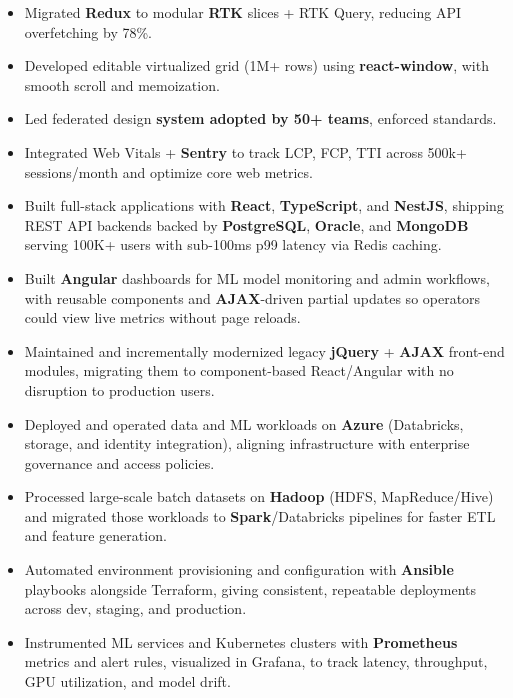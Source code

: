 \documentclass[a4paper]{article}
\begin{document}
\begin{itemize}
\item {Migrated \textbf{Redux} to modular \textbf{RTK} slices + RTK Query, reducing API overfetching by 78\%.}
\item {Developed editable virtualized grid (1M+ rows) using \textbf{react-window}, with smooth scroll and memoization.}
\item {Led federated design \textbf{system adopted by 50+ teams}, enforced standards.}
\item {Integrated Web Vitals + \textbf{Sentry} to track LCP, FCP, TTI across 500k+ sessions/month and optimize core web metrics.}
\item {Built full-stack applications with \textbf{React}, \textbf{TypeScript}, and \textbf{NestJS}, shipping REST API backends backed by \textbf{PostgreSQL}, \textbf{Oracle}, and \textbf{MongoDB} serving 100K+ users with sub-100ms p99 latency via Redis caching.}
\item {Built \textbf{Angular} dashboards for ML model monitoring and admin workflows, with reusable components and \textbf{AJAX}-driven partial updates so operators could view live metrics without page reloads.}
\item {Maintained and incrementally modernized legacy \textbf{jQuery} + \textbf{AJAX} front-end modules, migrating them to component-based React/Angular with no disruption to production users.}
\item {Deployed and operated data and ML workloads on \textbf{Azure} (Databricks, storage, and identity integration), aligning infrastructure with enterprise governance and access policies.}
\item {Processed large-scale batch datasets on \textbf{Hadoop} (HDFS, MapReduce/Hive) and migrated those workloads to \textbf{Spark}/Databricks pipelines for faster ETL and feature generation.}
\item {Automated environment provisioning and configuration with \textbf{Ansible} playbooks alongside Terraform, giving consistent, repeatable deployments across dev, staging, and production.}
\item {Instrumented ML services and Kubernetes clusters with \textbf{Prometheus} metrics and alert rules, visualized in Grafana, to track latency, throughput, GPU utilization, and model drift.}


\end{itemize}
\end{document}
